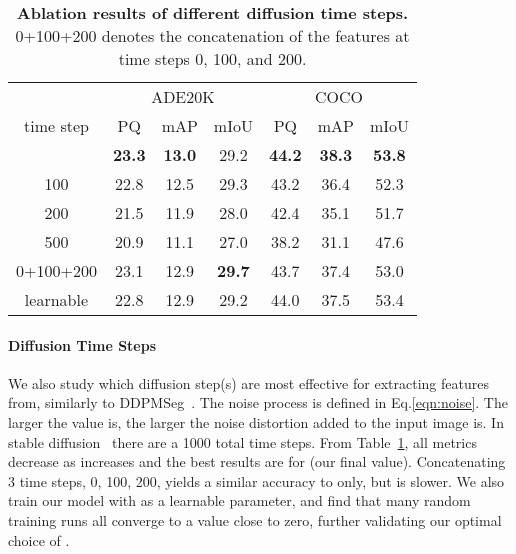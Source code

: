 \documentclass[10pt,twocolumn,letterpaper]{article}
\newcommand{\tablestyle}[2]{\setlength{\tabcolsep}{#1}\renewcommand{\arraystretch}{#2}\centering\small}
\begin{document}
\begin{table}[]
\tablestyle{6pt}{1.1}
\begin{tabular}{c|ccc|ccc}
          & \multicolumn{3}{c|}{ADE20K}                    & \multicolumn{3}{c}{COCO}                      \\
time step  & PQ            & mAP           & mIoU          & PQ            & mAP           & mIoU          \\
\shline
0         & \textbf{23.3} & \textbf{13.0} & 29.2 & \textbf{44.2} & \textbf{38.3} & \textbf{53.8} \\
100       & 22.8          & 12.5          & 29.3          & 43.2          & 36.4          & 52.3          \\
200       & 21.5          & 11.9          & 28.0          & 42.4          & 35.1          & 51.7          \\
500       & 20.9          & 11.1          & 27.0          & 38.2          & 31.1          & 47.6          \\
0+100+200 & 23.1          & 12.9          & \textbf{29.7}          & 43.7          & 37.4          & 53.0          \\
\hline
learnable & 22.8          & 12.9          & 29.2          & 44.0          & 37.5          & 53.4            
\end{tabular}
\vspace{-.5em}
\caption{
    \label{tab:step}
    \textbf{Ablation results of different diffusion time steps.} 0+100+200 denotes the concatenation of the features at time steps 0, 100, and 200.
}
\vspace{-1.5em}
\end{table}
\paragraph{Diffusion Time Steps}
We also study which diffusion step(s) are most effective for extracting features from, similarly to DDPMSeg~\cite{baranchuk2021ddpmseg}.
The noise process is defined in Eq.\ref{eqn:noise}. The larger the  value is, the larger the noise distortion added to the input image is.
In stable diffusion~\cite{rombach2022ldm} there are a 1000 total time steps. 
From Table~\ref{tab:step}, all metrics decrease as  increases and the best results are for  (our final value). 
Concatenating 3 time steps, 0, 100, 200, yields a similar accuracy to  only, but is  slower. 
We also train our model with  as a learnable parameter, and find that many random training runs all converge to a value close to zero, further validating our optimal choice of .
\end{document}
